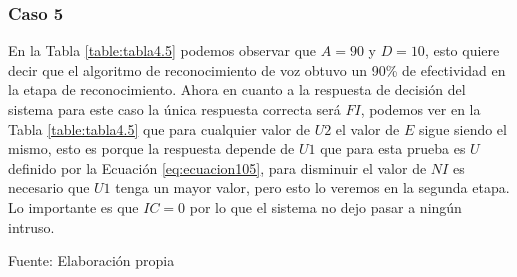 \subsubsection{Caso 5}
En la Tabla \ref{table:tabla4.5} podemos observar que $A = 90$ y $D = 10$, esto quiere decir que el algoritmo de reconocimiento de voz obtuvo un 90\% de efectividad en la etapa de reconocimiento.
\vskip 0.5cm
Ahora en cuanto a la respuesta de decisión del sistema para este caso la única respuesta correcta será $FI$, podemos ver en la Tabla \ref{table:tabla4.5} que para cualquier valor de $U2$ el valor de $E$ sigue siendo el mismo, esto es porque la respuesta depende de $U1$ que para esta prueba es $U$ definido por la Ecuación \eqref{eq:ecuacion105}, para disminuir el valor de $NI$ es necesario que $U1$ tenga un mayor valor, pero esto lo veremos en la segunda etapa. Lo importante es que $IC = 0$ por lo que el sistema no dejo pasar a ningún intruso.

\begin{center}
\begin{table}[H]
\centering
\caption{\small{Resultados para obtener U2 en el caso 5.}}
\label{table:tabla4.5}
\vskip 0.2cm
\begin{center}
\vskip 0.2cm
{\small{Fuente: Elaboración propia}}
\end{center}
\end{table}
\end{center}

